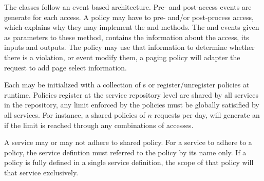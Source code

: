 The  classes follow an event based architecture.
Pre- and post-access events are generate for each access. A policy may
have to pre- and/or post-process access, which explains why they may
implement the  and
 methods. The
 and  events given as
parameters to these method, contains the information about the access,
its inputs and outputs. The policy may use that information to
determine whether there is a violation, or event modify them, \eg a
paging policy will adapter the request to add page select information.

Each  may be initialized with a collection of
s or register/unregister policies at runtime.
Policies register at the service repository level are shared by all
services in the repository, \ie any limit enforced by the policies
must be globally satisified by all services. For instance, a shared
policies of $n$ requests per day, will generate an
 if the limit is reached through any
combinations of accesses.

A service may or may not adhere to shared policy. For a service to adhere to a
policy, the service defintion must referred to the policy by its name
only.
If a policy is fully defined in a single service definition, the scope
of that policy will that service exclusively.
